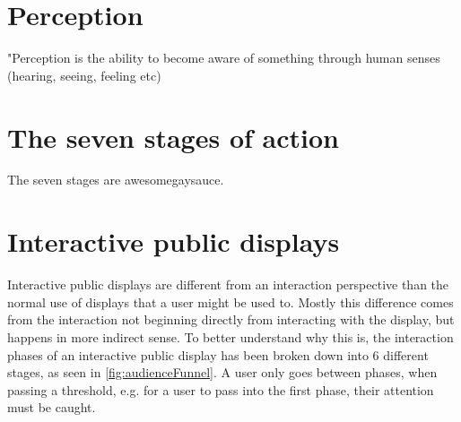 




\section{Perception}
"Perception is the ability to become aware of something through human senses (hearing, seeing, feeling etc)\\







\section{The seven stages of action} %
    The seven stages are awesomegaysauce. 



\section{Interactive public displays} %
    Interactive public displays are different from an interaction perspective than the normal use of displays that a user might be used to\cite{interactivePublicDisplays}. Mostly this difference comes from the interaction not beginning directly from interacting with the display, but happens in more indirect sense. To better understand why this is, the interaction phases of an interactive public display has been broken down into 6 different stages, as seen in \autoref{fig:audienceFunnel}. A user only goes between phases, when passing a threshold, e.g. for a user to pass into the first phase, their attention must be caught\cite{interactivePublicDisplays}.
    

